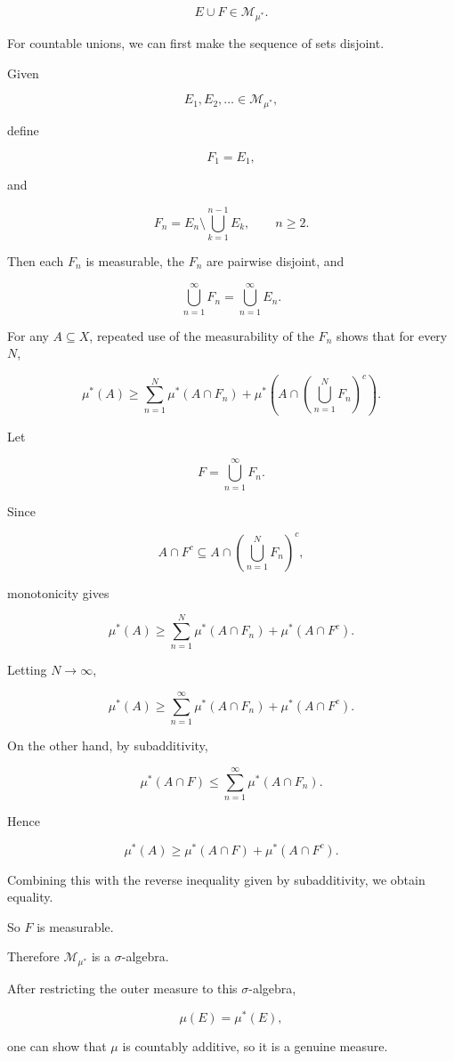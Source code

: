 \documentclass[11pt]{article}
\begin{document}
\[
E\cup F\in\mathcal{M}_{\mu^{*}}.
\]

For countable unions, we can first make the sequence of sets disjoint.

Given

\[
E_{1},E_{2},\ldots\in\mathcal{M}_{\mu^{*}},
\]

define

\[
F_{1}=E_{1},
\]

and

\[
F_{n}=E_{n}\setminus\bigcup_{k=1}^{n-1}E_{k},\qquad n\geq2.
\]

Then each $F_{n}$ is measurable, the $F_{n}$ are pairwise disjoint, and

\[
\bigcup_{n=1}^{\infty}F_{n}=\bigcup_{n=1}^{\infty}E_{n}.
\]

For any $A\subseteq X$, repeated use of the measurability of the $F_{n}$ shows that for every $N$,

\[
\mu^{*}(A)\geq\sum_{n=1}^{N}\mu^{*}(A\cap F_{n})+\mu^{*}\left(A\cap\left(\bigcup_{n=1}^{N}F_{n}\right)^{c}\right).
\]

Let

\[
F=\bigcup_{n=1}^{\infty}F_{n}.
\]

Since

\[
A\cap F^{c}\subseteq A\cap\left(\bigcup_{n=1}^{N}F_{n}\right)^{c},
\]

monotonicity gives

\[
\mu^{*}(A)\geq\sum_{n=1}^{N}\mu^{*}(A\cap F_{n})+\mu^{*}(A\cap F^{c}).
\]

Letting $N\rightarrow\infty$,

\[
\mu^{*}(A)\geq\sum_{n=1}^{\infty}\mu^{*}(A\cap F_{n})+\mu^{*}(A\cap F^{c}).
\]

On the other hand, by subadditivity,

\[
\mu^{*}(A\cap F)\leq\sum_{n=1}^{\infty}\mu^{*}(A\cap F_{n}).
\]

Hence

\[
\mu^{*}(A)\geq\mu^{*}(A\cap F)+\mu^{*}(A\cap F^{c}).
\]

Combining this with the reverse inequality given by subadditivity, we obtain equality.

So $F$ is measurable.

Therefore $\mathcal{M}_{\mu^{*}}$ is a $\sigma$-algebra.

After restricting the outer measure to this $\sigma$-algebra,

\[
\mu(E)=\mu^{*}(E),
\]

one can show that $\mu$ is countably additive, so it is a genuine measure.
\end{document}
